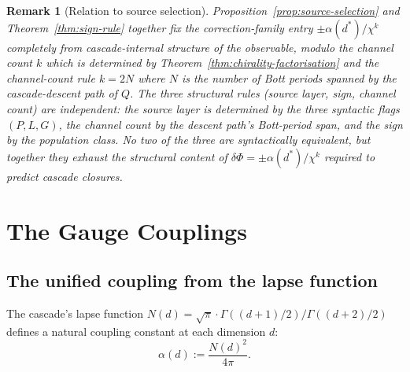 \documentclass[12pt,a4paper]{article}
\newtheorem*{remark}{Remark}
\begin{document}
\begin{remark}[Relation to source selection]\label{rem:sign-source-selection-pairing}
Proposition~\ref{prop:source-selection} and Theorem~\ref{thm:sign-rule}
together fix the correction-family entry $\pm\alpha(d^*)/\chi^k$
completely from cascade-internal structure of the observable, modulo
the channel count $k$ which is determined by
Theorem~\ref{thm:chirality-factorisation} and the channel-count rule
$k = 2N$ where $N$ is the number of Bott periods spanned by the
cascade-descent path of $Q$. The three structural rules (source layer,
sign, channel count) are independent: the source layer is determined
by the three syntactic flags $(P,L,G)$, the channel count by the
descent path's Bott-period span, and the sign by the population class.
No two of the three are syntactically equivalent, but together they
exhaust the structural content of $\delta\Phi = \pm\alpha(d^*)/\chi^k$
required to predict cascade closures.
\end{remark}
\section{The Gauge Couplings}\label{sec:gauge-couplings}

\subsection{The unified coupling from the lapse function}

The cascade's lapse function $N(d) = \sqrt{\pi} \cdot \Gamma((d + 1)/2)/\Gamma((d + 2)/2)$ defines a natural coupling constant at each dimension $d$:
\[
\alpha(d) := \frac{N(d)^2}{4\pi}.
\]
\end{document}
